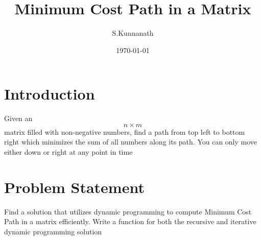 \documentclass{article}
\title{Minimum Cost Path in a Matrix}
\author{S.Kunnanath}
\date{\today}
\begin{document}
\maketitle

\section{Introduction}
Given an \[n \times m\] matrix filled with non-negative numbers, find a path from top left to bottom right which minimizes the sum of all numbers along its path. You can only move either down or right at any point in time


\section{Problem Statement}
Find a solution that utilizes dynamic programming to compute Minimum Cost Path in a matrix efficiently.
Write a function for both the recursive and iterative dynamic programming solution 
\end{document}
